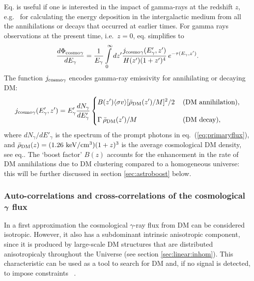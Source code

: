 \smallskip

Eq. is useful if one is interested in the impact of gamma-rays at the redshift $z$, e.g.~
for calculating the energy deposition in the intergalactic medium from all the annihilations or decays that occurred at earlier times.
For gamma rays observations at the present time, i.e.~$z=0$, eq. simplifies to 
\begin{equation}
\label{eq:EGfluxtoday}
\frac{d\Phi_{{\rm cosmo}\gamma}}{dE_\gamma} = \frac{1}{E_\gamma} \int\limits_0^{\infty}dz' \frac{ j_{{\rm cosmo}\gamma}(E'_\gamma,z') }{H(z')(1+z')^{4}} \, e^{-\tau(E_\gamma,z')}.
\end{equation}
The function  $j_{{\rm cosmo}\gamma}$ encodes gamma-ray emissivity for annihilating or decaying DM:
\begin{equation}
\label{jEGprompt}
j_{{\rm cosmo}\gamma}(E'_\gamma,z') = E'_\gamma \frac{dN_\gamma}{dE'_\gamma} \begin{cases}
\displaystyle  B(z') \langle \sigma v \rangle  [{\bar{\rho}_{\rm DM}(z')}/{M }]^2 /2 \,   
& \text{(DM annihilation)},\\[4mm]
\displaystyle \Gamma \,  \bar{\rho}_{\rm DM}(z') /M & \text{(DM decay)},
\end{cases}
\end{equation}
where $dN_{\gamma}/dE'_\gamma$ is the spectrum of the prompt photons in eq.~(\ref{eq:primaryflux}),
and $\bar{\rho}_{\rm DM}(z) = (1.26 \ {\rm keV} / {\rm cm}^{3})(1+z)^3$ is the average cosmological DM density,
see eq.. 
The `boost factor' $B(z)$ 
accounts for the enhancement in the rate of DM annihilations due to DM clustering compared to
a homogeneous universe: this will be further discussed 
in section \ref{sec:astroboost} below. 



\subsubsection{Auto-correlations and cross-correlations of the cosmological  ${\bm{\gamma}}$ flux}
\label{sec:correlations}
In a first approximation the cosmological $\gamma$-ray flux from DM can be considered isotropic. However, 
it also has a subdominant intrinsic anisotropic component, since it is produced by large-scale DM structures that are distributed anisotropicaly throughout the Universe
(see section \ref{sec:linear:inhom}).
This characteristic can be used as a tool to search for DM and, if no signal is detected, to impose constraints
~\cite{crosscorrelations}. 

